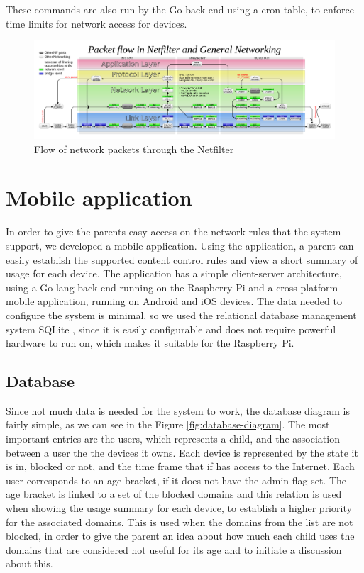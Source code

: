 These commands are also run by the Go back-end using a cron table, to enforce time limits for network access for devices.

\begin{figure}[th]
\centering
\includegraphics[width=1\textwidth]{Figures/netfilter-flow}
\decoRule
\caption{Flow of network packets through the Netfilter}
\label{fig:netfilter-flow}
\end{figure}

\section{Mobile application}

In order to give the parents easy access on the network rules that the system support, we developed a mobile application.
Using the application, a parent can easily establish the supported content control rules and view a short summary of usage for each device. The application has a simple client-server architecture, using a Go-lang back-end running on the Raspberry Pi and a cross platform mobile application, running on Android and iOS devices. The data needed to configure the system is minimal, so we used the relational database management system SQLite \citep{sqlite}, since it is easily configurable and does not require powerful hardware to run on, which makes it suitable for the Raspberry Pi. 


\subsection{Database}
Since not much data is needed for the system to work, the database diagram is fairly simple, as we can see in the Figure \ref{fig:database-diagram}. The most important entries are the users, which represents a child, and the association between a user the the devices it owns. Each device is represented by the state it is in, blocked or not, and the time frame that if has access to the Internet. Each user corresponds to an age bracket, if it does not have the admin flag set. The age bracket is linked to a set of the blocked domains and this relation is used when showing the usage summary for each device, to establish a higher priority for the associated domains. This is used when the domains from the list are not blocked, in order to give the parent an idea about how much each child uses the domains that are considered not useful for its age and to initiate a discussion about this.

